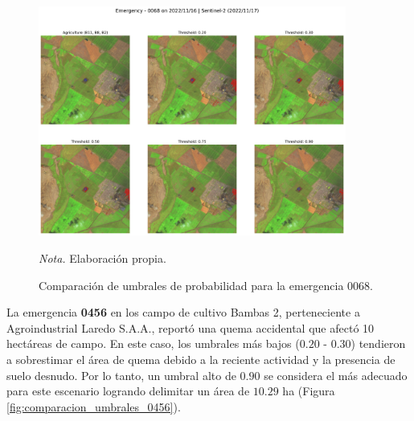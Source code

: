 \begin{figure}[H]
    \centering
    \caption{Comparación de umbrales de probabilidad para la emergencia 0068.}
    \label{fig:comparacion_umbrales_0068}
    \includegraphics[width=0.9\textwidth]{img/7_resultados/0068.png}
    \begin{flushleft}
        \vspace{-\baselineskip}
        \textit{Nota.} Elaboración propia.
        \vspace{-\baselineskip}
    \end{flushleft}
\end{figure}

La emergencia \textbf{0456} en los campo de cultivo Bambas 2, perteneciente a Agroindustrial Laredo S.A.A., reportó una quema accidental que afectó 10 hectáreas de campo. En este caso, los umbrales más 
bajos ($0.20$ - $0.30$) tendieron a sobrestimar el área de quema debido a la reciente actividad y la presencia de suelo desnudo. Por lo tanto, un umbral alto de $0.90$ se considera el más adecuado 
para este escenario logrando delimitar un área de $10.29$ ha (Figura \ref{fig:comparacion_umbrales_0456}).

